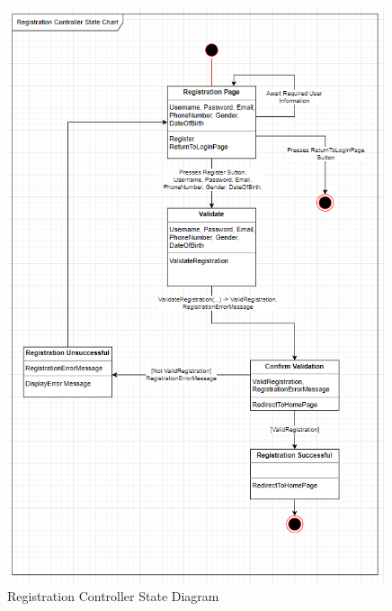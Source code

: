 \documentclass[]{article}
\begin{document}
\pagebreak

\begin{figure}[h]
	\centering
	\includegraphics[width=30em]{assets/D3_2.PNG}
	\caption{Registration Controller State Diagram}
	\label{fig:acd}
\end{figure}
\pagebreak
\end{document}
